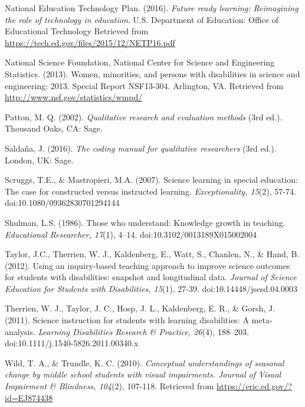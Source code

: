 \documentclass[11.5pt]{sig-alternate} %
\begin{document}
National Education Technology Plan. (2016). \textit{Future ready learning: Reimagining the role of technology in education}. U.S. Department of Education: Office of Educational Technology Retrieved from \url{https://tech.ed.gov/files/2015/12/NETP16.pdf}

National Science Foundation, National Center for Science and Engineering Statistics. (2013). Women, minorities, and persons with disabilities in science and engineering: 2013. Special Report NSF13-304. Arlington, VA. Retrieved from	\url{http://www.nsf.gov/statistics/wmpd/}

Patton, M. Q. (2002). \textit{Qualitative research and evaluation methods} (3rd ed.). Thousand Oaks, CA: Sage.

Saldaña, J. (2016). \textit{The coding manual for qualitative researchers} (3rd ed.). London, UK: Sage.

Scruggs, T.E.,  \& Mastropieri, M.A. (2007). Science learning in special education: The case for constructed versus instructed learning. \textit{Exceptionality, 15}(2), 57-74. doi:10.1080/09362830701294144

Shulman, L.S. (1986). Those who understand: Knowledge growth in teaching. \textit{Educational Researcher, 17}(1), 4–14. doi:10.3102/0013189X015002004

Taylor, J.C., Therrien, W. J., Kaldenberg, E., Watt, S., Chanlen, N., \& Hand, B. (2012). Using an 	inquiry-based teaching approach to improve science outcomes for students with disabilities: snapshot and longitudinal data. \textit{Journal of Science Education for Students 	with Disabilities, 15}(1), 27-39. doi:10.14448/jsesd.04.0003

Therrien, W. J., Taylor, J. C., Hosp, J. L., Kaldenberg, E. R., \& Gorsh, J. (2011). Science instruction for students with learning disabilities: A meta-analysis. \textit{Learning Disabilities Research \& Practice, 26}(4), 188–203. doi:10.1111/j.1540-5826.2011.00340.x

Wild, T. A., \& Trundle, K. C. (2010). \textit{Conceptual understandings of seasonal change by middle school students with visual impairments. Journal of Visual Impairment \& Blindness, 104}(2), 107-118. Retrieved from \url{https://eric.ed.gov/?id=EJ874438}
\end{document}
